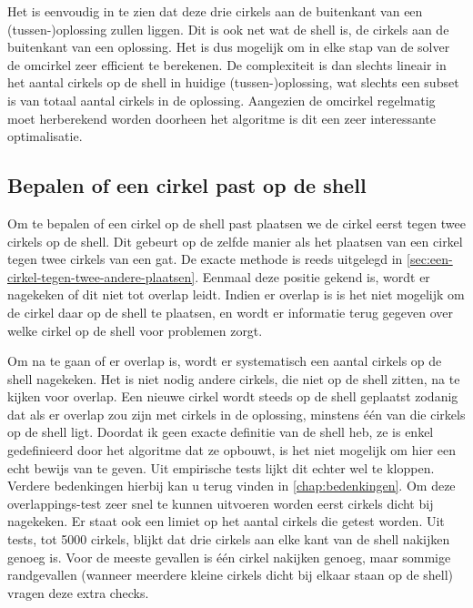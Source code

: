 \documentclass[12pt,a4paper,oneside]{book}
\begin{document}
Het is eenvoudig in te zien dat deze drie cirkels aan de buitenkant van een (tussen-)oplossing zullen liggen.
Dit is ook net wat de shell is, de cirkels aan de buitenkant van een oplossing.
Het is dus mogelijk om in elke stap van de solver de omcirkel zeer efficient te berekenen.
De complexiteit is dan slechts lineair in het aantal cirkels op de shell in huidige (tussen-)oplossing, wat slechts een subset is van totaal aantal cirkels in de oplossing.
Aangezien de omcirkel regelmatig moet herberekend worden doorheen het algoritme is dit een zeer interessante optimalisatie.

\subsection{Bepalen of een cirkel past op de shell} \label{sec:bepalen-of-een-cirkel-past-op-de-shell}

Om te bepalen of een cirkel op de shell past plaatsen we de cirkel eerst tegen twee cirkels op de shell.
Dit gebeurt op de zelfde manier als het plaatsen van een cirkel tegen twee cirkels van een gat.
De exacte methode is reeds uitgelegd in \autoref{sec:een-cirkel-tegen-twee-andere-plaatsen}.
Eenmaal deze positie gekend is, wordt er nagekeken of dit niet tot overlap leidt.
Indien er overlap is is het niet mogelijk om de cirkel daar op de shell te plaatsen, en wordt er informatie terug gegeven over welke cirkel op de shell voor problemen zorgt.

Om na te gaan of er overlap is, wordt er systematisch een aantal cirkels op de shell nagekeken.
Het is niet nodig andere cirkels, die niet op de shell zitten, na te kijken voor overlap.
Een nieuwe cirkel wordt steeds op de shell geplaatst zodanig dat als er overlap zou zijn met cirkels in de oplossing, minstens één van die cirkels op de shell ligt.
Doordat ik geen exacte definitie van de shell heb, ze is enkel gedefinieerd door het algoritme dat ze opbouwt, is het niet mogelijk om hier een echt bewijs van te geven.
Uit empirische tests lijkt dit echter wel te kloppen.
Verdere bedenkingen hierbij kan u terug vinden in \autoref{chap:bedenkingen}.
Om deze overlappings-test zeer snel te kunnen uitvoeren worden eerst cirkels dicht bij nagekeken.
Er staat ook een limiet op het aantal cirkels die getest worden.
Uit tests, tot 5000 cirkels, blijkt dat drie cirkels aan elke kant van de shell nakijken genoeg is.
Voor de meeste gevallen is één cirkel nakijken genoeg, maar sommige randgevallen (wanneer meerdere kleine cirkels dicht bij elkaar staan op de shell) vragen deze extra checks.
\end{document}
